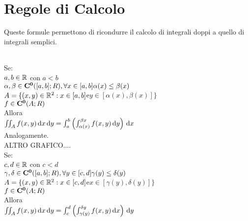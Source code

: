 \section{Regole di Calcolo}
Queste formule permettono di ricondurre il calcolo di integrali doppi a quello di integrali semplici.\\
\\
Se:\\
$a,b\in \mathbb{R}$ con $a<b$\\
$\alpha,\beta\in \mathbf{C^{0}}([a,b];R), \forall x\in[a,b] \alpha(x)\le\beta(x)$\\
$A=\{(x,y)\in \mathbb{R}^2: x\in [a,b] $e$ y\in [\alpha(x),\beta(x)] \}$\\
$f\in \mathbf{C^{0}}(A;R)$\\
Allora\\
$\iint_Af(x,y)\,\mathrm{d}{x}\,\mathrm{d}{y}=\int_a^b\left(\int_{\alpha(x)}^{\beta{x}}f(x,y)\,\mathrm{d}{y}\right)\,\mathrm{d}{x}$\\
Analogamente.\\
ALTRO GRAFICO....\\
Se:\\
$c,d\in \mathbb{R}$ con $c<d$\\
$\gamma,\delta\in \mathbf{C^{0}}([a,b];R), \forall y\in[c,d] \gamma(y)\le\delta(y)$\\
$A=\{(x,y)\in \mathbb{R}^2: x\in [c,d] $e$ x\in [\gamma(y),\delta(y)] \}$\\
$f\in \mathbf{C^{0}}(A;R)$\\
Allora\\
$\iint_Af(x,y)\,\mathrm{d}{x}\,\mathrm{d}{y}=\int_c^d\left(\int_{\gamma(y)}^{\delta{y}}f(x,y)\,\mathrm{d}{x}\right)\,\mathrm{d}{y}$
\newpage
